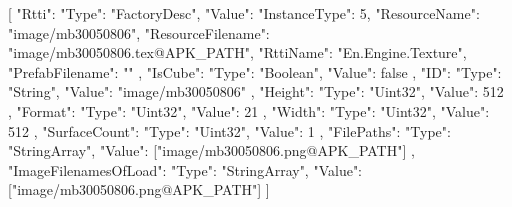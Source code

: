 [{
        "Rtti": {
            "Type": "FactoryDesc",
            "Value": {
                "InstanceType": 5,
                "ResourceName": "image/mb30050806",
                "ResourceFilename": "image/mb30050806.tex@APK_PATH",
                "RttiName": "En.Engine.Texture",
                "PrefabFilename": ""
            }
        },
        "IsCube": {
            "Type": "Boolean",
            "Value": false
        },
        "ID": {
            "Type": "String",
            "Value": "image/mb30050806"
        },
        "Height": {
            "Type": "Uint32",
            "Value": 512
        },
        "Format": {
            "Type": "Uint32",
            "Value": 21
        },
        "Width": {
            "Type": "Uint32",
            "Value": 512
        },
        "SurfaceCount": {
            "Type": "Uint32",
            "Value": 1
        },
        "FilePaths": {
            "Type": "StringArray",
            "Value": ["image/mb30050806.png@APK_PATH"]
        },
        "ImageFilenamesOfLoad": {
            "Type": "StringArray",
            "Value": ["image/mb30050806.png@APK_PATH"]
        }
    }]